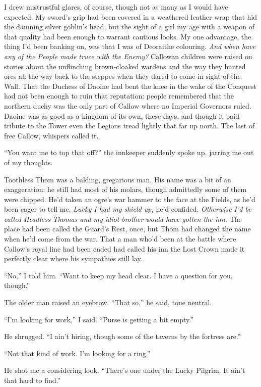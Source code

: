 \documentclass[12pt, openany]{book}
\begin{document}
I drew mistrustful glares, of course, though not as many as I would have expected. My sword’s grip had been covered in a weathered leather wrap that hid the damning silver goblin’s head, but the sight of a girl my age with a weapon of that quality had been enough to warrant cautious looks. My one advantage, the thing I’d been banking on, was that I was of Deoraithe colouring. \textit{And when have any of the People made truce with the Enemy?} Callowan children were raised on stories about the unflinching brown-cloaked wardens and the way they hunted orcs all the way back to the steppes when they dared to come in sight of the Wall. That the Duchess of Daoine had bent the knee in the wake of the Conquest had not been enough to ruin that reputation: people remembered that the northern duchy was the only part of Callow where no Imperial Governors ruled. Daoine was as good as a kingdom of its own, these days, and though it paid tribute to the Tower even the Legions tread lightly that far up north. The last of free Callow, whispers called it.

“You want me to top that off?” the innkeeper suddenly spoke up, jarring me out of my thoughts.

Toothless Thom was a balding, gregarious man. His name was a bit of an exaggeration: he still had most of his molars, though admittedly some of them were chipped. He’d taken an ogre’s war hammer to the face at the Fields, as he’d been eager to tell me. \textit{Lucky I had my shield up,} he’d confided. \textit{Otherwise I’d be called Headless Thomas and my idiot brother would have gotten the inn.} The place had been called the Guard’s Rest, once, but Thom had changed the name when he’d come from the war. That a man who’d been at the battle where Callow’s royal line had been ended had called his inn the Lost Crown made it perfectly clear where his sympathies still lay.

“No,” I told him. “Want to keep my head clear. I have a question for you, though.”

The older man raised an eyebrow. “That so,” he said, tone neutral.

“I’m looking for work,” I said. “Purse is getting a bit empty.”

He shrugged. “I ain’t hiring, though some of the taverns by the fortress are.”

“Not that kind of work. I’m looking for a ring.”

He shot me a considering look. “There’s one under the Lucky Pilgrim. It ain’t that hard to find.”
\end{document}
